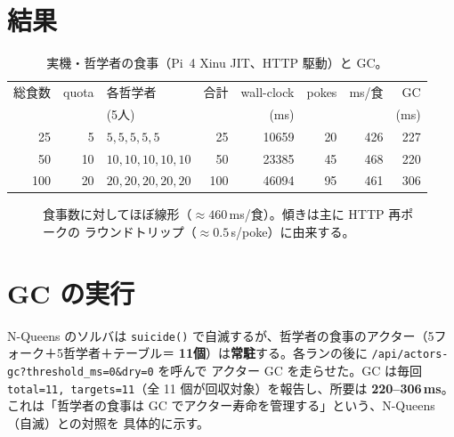 \documentclass[11pt]{ltjsarticle}
\begin{document}
\section{結果}
\begin{table}[h]\centering
\caption{実機・哲学者の食事（Pi~4 Xinu JIT、HTTP 駆動）と GC。}
\label{tab:din}
\begin{tabular}{rrl rrr rr}
\toprule
総食数 & quota & 各哲学者 & 合計 & wall-clock & pokes & ms/食 & GC \\
       &       & (5人)   &     & (ms) &  &  & (ms) \\
\midrule
25  & 5  & $5,5,5,5,5$        & 25  & 10659 & 20 & 426 & 227 \\
50  & 10 & $10,10,10,10,10$   & 50  & 23385 & 45 & 468 & 220 \\
100 & 20 & $20,20,20,20,20$   & 100 & 46094 & 95 & 461 & 306 \\
\bottomrule
\end{tabular}
\end{table}

\begin{figure}[h]\centering
{}
\caption{食事数に対してほぼ線形（$\approx 460$\,ms/食）。傾きは主に HTTP 再ポークの
ラウンドトリップ（$\approx 0.5$\,s/poke）に由来する。}
\label{fig:din}
\end{figure}

\section{GC の実行}
N-Queens のソルバは \texttt{suicide()} で自滅するが、哲学者の食事のアクター（5フォーク＋5哲学者＋テーブル＝
\textbf{11個}）は\textbf{常駐}する。各ランの後に \texttt{/api/actors-gc?threshold\_ms=0\&dry=0} を呼んで
アクター GC を走らせた。GC は毎回 \texttt{total=11, targets=11}（全 11 個が回収対象）を報告し、所要は
\textbf{220--306\,ms}。これは「哲学者の食事は GC でアクター寿命を管理する」という、N-Queens（自滅）との対照を
具体的に示す。
\end{document}
